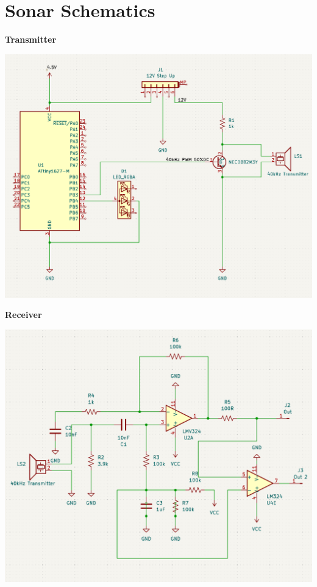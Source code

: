 \documentclass[11pt,a4paper,titlepage]{report}
\begin{document}
	\chapter{Sonar Schematics}\label{appendix:sonar_schematics}
	
	\textbf{Transmitter}
	\begin{center}
		\label{picture:sonar_schema1}
		\includegraphics[scale=0.3]{assets/sonar_transmitter.png}
	\end{center}
	\newpage
	\textbf{Receiver}
	\begin{center}
		\label{picture:sonar_schema2}
		\includegraphics[scale=0.3]{assets/sonar_receiver.png}
	\end{center}
	
\end{document}
